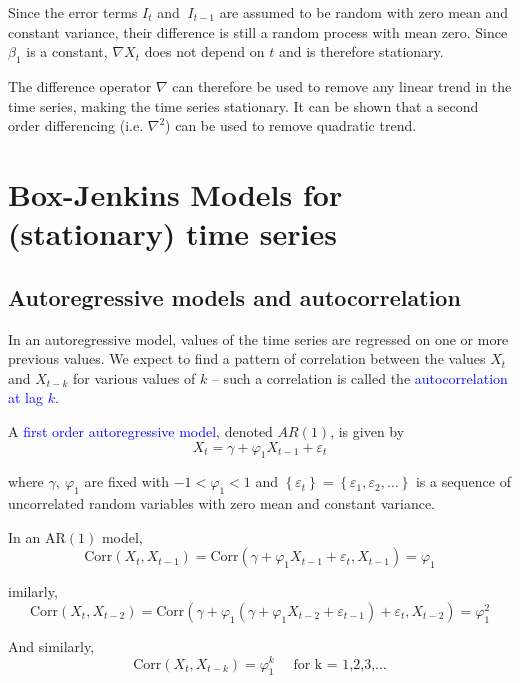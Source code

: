 \documentclass[12pt,a4paper,openany,twoside]{report}
\newcommand{\blue}{\textcolor{blue}}
\newcommand{\emphx}[1]{\blue{#1}}
\theoremstyle{definition}
\theoremstyle{remark}
\theoremstyle{plain}
\theoremstyle{definition}
\theoremstyle{definition}
\theoremstyle{definition}
\theoremstyle{remark}
\begin{document}
Since the error terms \(I_{t}\) and \(\ I_{t - 1}\) are assumed to be
random with zero mean and constant variance, their difference is still a random process with mean zero.
Since \(\beta_{1}\) is a
constant, \(\nabla X_{t}\) does not depend on \(t\) and is therefore
stationary.

The difference operator \(\nabla\) can therefore be used to remove any
linear trend in the time series, making the time series stationary.
It can be shown that a second order differencing (i.e.
\(\nabla^{2}\)) can be used to remove quadratic trend.

\hypertarget{boxjenkins}{%
\section{Box-Jenkins Models for (stationary) time series}\label{boxjenkins}}

\hypertarget{aracf}{%
\subsection{Autoregressive models and autocorrelation}\label{aracf}}

In an autoregressive model, values of the time series are regressed on
one or more previous values. We expect to find a pattern of correlation
between the values \(X_{t}\) and \(X_{t - k}\) for various values of \(k\)
-- such a correlation is called the \emphx{autocorrelation at lag $k$}.

A \emphx{first order autoregressive model}, denoted \(AR(1)\), is
given by
\[X_{t} = \gamma + \varphi_{1}X_{t - 1} + \varepsilon_{t}\]

where \(\gamma,\ \varphi_{1}\) are fixed with \(- 1 < \varphi_{1} < 1\)
and \(\left\{ \varepsilon_{t} \right\} = \left\{ \varepsilon_{1},\varepsilon_{2},\ldots \right\}\)
is a sequence of uncorrelated random variables with zero mean and
constant variance.

In an \(\text{AR}\left( 1 \right)\) model,
\[\text{Corr}\left( X_{t},X_{t - 1} \right) = \text{Corr}(\gamma + \varphi_{1}X_{t - 1} + 
\varepsilon_{t},X_{t - 1}) = \varphi_{1}\]

imilarly,
\[\text{Corr}\left( X_{t},X_{t - 2} \right) = \text{Corr}\left( \gamma + \varphi_{1}\left( \gamma +
\varphi_{1}X_{t - 2} + \varepsilon_{t - 1} \right) + \varepsilon_{t},X_{t - 2} \right) = 
\varphi_{1}^{2}\]

And similarly,
\[\text{Corr}\left( X_{t},X_{t - k} \right) = \varphi_{1}^{k} \quad \mbox{ for k = 1,2,3,\ldots}\]
\end{document}
